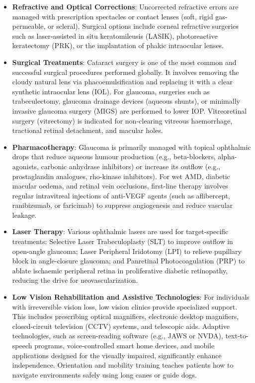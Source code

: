 \begin{itemize}
    \item \textbf{Refractive and Optical Corrections}: Uncorrected refractive errors are managed with prescription spectacles or contact lenses (soft, rigid gas-permeable, or scleral). Surgical options include corneal refractive surgeries such as laser-assisted in situ keratomileusis (LASIK), photoreactive keratectomy (PRK), or the implantation of phakic intraocular lenses.
    \item \textbf{Surgical Treatments}: Cataract surgery is one of the most common and successful surgical procedures performed globally. It involves removing the cloudy natural lens via phacoemulsification and replacing it with a clear synthetic intraocular lens (IOL). For glaucoma, surgeries such as trabeculectomy, glaucoma drainage devices (aqueous shunts), or minimally invasive glaucoma surgery (MIGS) are performed to lower IOP. Vitreoretinal surgery (vitrectomy) is indicated for non-clearing vitreous haemorrhage, tractional retinal detachment, and macular holes.
    \item \textbf{Pharmacotherapy}: Glaucoma is primarily managed with topical ophthalmic drops that reduce aqueous humour production (e.g., beta-blockers, alpha-agonists, carbonic anhydrase inhibitors) or increase its outflow (e.g., prostaglandin analogues, rho-kinase inhibitors). For wet AMD, diabetic macular oedema, and retinal vein occlusions, first-line therapy involves regular intravitreal injections of anti-VEGF agents (such as aflibercept, ranibizumab, or faricimab) to suppress angiogenesis and reduce vascular leakage.
    \item \textbf{Laser Therapy}: Various ophthalmic lasers are used for target-specific treatments: Selective Laser Trabeculoplasty (SLT) to improve outflow in open-angle glaucoma; Laser Peripheral Iridotomy (LPI) to relieve pupillary block in angle-closure glaucoma; and Panretinal Photocoagulation (PRP) to ablate ischaemic peripheral retina in proliferative diabetic retinopathy, reducing the drive for neovascularization.
    \item \textbf{Low Vision Rehabilitation and Assistive Technologies}: For individuals with irreversible vision loss, low vision clinics provide specialized support. This includes prescribing optical magnifiers, electronic desktop magnifiers, closed-circuit television (CCTV) systems, and telescopic aids. Adaptive technologies, such as screen-reading software (e.g., JAWS or NVDA), text-to-speech programs, voice-controlled smart home devices, and mobile applications designed for the visually impaired, significantly enhance independence. Orientation and mobility training teaches patients how to navigate environments safely using long canes or guide dogs.
\end{itemize}

